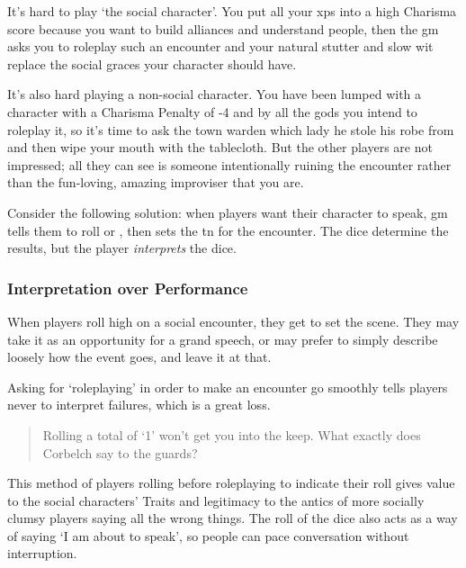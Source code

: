 \begin{multicols}{2}

\noindent
It's hard to play `the social character'.
You put all your \glspl{xp} into a high Charisma score because you want to build alliances and understand people, then the \gls{gm} asks you to roleplay such an encounter and your natural stutter and slow wit replace the social graces your character should have.

It's also hard playing a non-social character.
You have been lumped with a character with a Charisma Penalty of -4 and by all the gods you intend to roleplay it, so it's time to ask the town \gls{warden} which lady he stole his robe from and then wipe your mouth with the tablecloth.
But the other players are not impressed; all they can see is someone intentionally ruining the encounter rather than the fun-loving, amazing improviser that you are.

Consider the following solution: when players want their character to speak, \gls{gm} tells them to roll  or , then sets the \gls{tn} for the encounter.
The dice determine the results, but the player \emph{interprets} the dice.

\subsubsection{Interpretation over Performance}

When players roll high on a social encounter, they get to set the scene.
They may take it as an opportunity for a grand speech, or may prefer to simply describe loosely how the event goes, and leave it at that.

Asking for `roleplaying' in order to make an encounter go smoothly tells players never to interpret failures, which is a great loss.

\begin{quotation}
  Rolling a total of `1' won't get you into the keep.
  What exactly does Corbelch say to the guards?
\end{quotation}

This method of players rolling before roleplaying to indicate their roll gives value to the social characters' Traits and legitimacy to the antics of more socially clumsy players saying all the wrong things.
The roll of the dice also acts as a way of saying `I am about to speak', so people can pace conversation without interruption.

\end{multicols}

